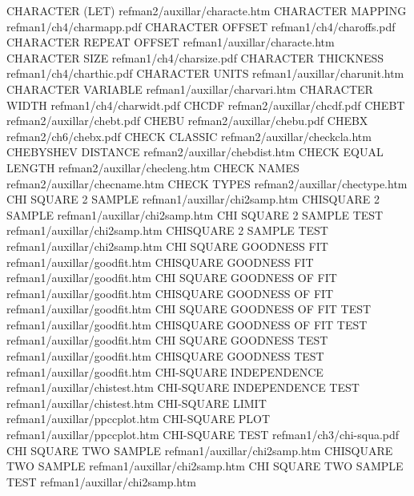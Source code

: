 CHARACTER (LET)                         refman2/auxillar/characte.htm
CHARACTER MAPPING                       refman1/ch4/charmapp.pdf
CHARACTER OFFSET                        refman1/ch4/charoffs.pdf
CHARACTER REPEAT OFFSET                 refman1/auxillar/characte.htm
CHARACTER SIZE                          refman1/ch4/charsize.pdf
CHARACTER THICKNESS                     refman1/ch4/charthic.pdf
CHARACTER UNITS                         refman1/auxillar/charunit.htm
CHARACTER VARIABLE                      refman1/auxillar/charvari.htm
CHARACTER WIDTH                         refman1/ch4/charwidt.pdf
CHCDF                                   refman2/auxillar/chcdf.pdf
CHEBT                                   refman2/auxillar/chebt.pdf
CHEBU                                   refman2/auxillar/chebu.pdf
CHEBX                                   refman2/ch6/chebx.pdf
CHECK CLASSIC                           refman2/auxillar/checkcla.htm
CHEBYSHEV DISTANCE                      refman2/auxillar/chebdist.htm
CHECK EQUAL LENGTH                      refman2/auxillar/checleng.htm
CHECK NAMES                             refman2/auxillar/checname.htm
CHECK TYPES                             refman2/auxillar/chectype.htm
CHI SQUARE 2 SAMPLE                     refman1/auxillar/chi2samp.htm
CHISQUARE 2 SAMPLE                      refman1/auxillar/chi2samp.htm
CHI SQUARE 2 SAMPLE TEST                refman1/auxillar/chi2samp.htm
CHISQUARE 2 SAMPLE TEST                 refman1/auxillar/chi2samp.htm
CHI SQUARE GOODNESS FIT                 refman1/auxillar/goodfit.htm
CHISQUARE GOODNESS FIT                  refman1/auxillar/goodfit.htm
CHI SQUARE GOODNESS OF FIT              refman1/auxillar/goodfit.htm
CHISQUARE GOODNESS OF FIT               refman1/auxillar/goodfit.htm
CHI SQUARE GOODNESS OF FIT TEST         refman1/auxillar/goodfit.htm
CHISQUARE GOODNESS OF FIT TEST          refman1/auxillar/goodfit.htm
CHI SQUARE GOODNESS TEST                refman1/auxillar/goodfit.htm
CHISQUARE GOODNESS TEST                 refman1/auxillar/goodfit.htm
CHI-SQUARE INDEPENDENCE                 refman1/auxillar/chistest.htm
CHI-SQUARE INDEPENDENCE TEST            refman1/auxillar/chistest.htm
CHI-SQUARE LIMIT                        refman1/auxillar/ppccplot.htm
CHI-SQUARE PLOT                         refman1/auxillar/ppccplot.htm
CHI-SQUARE TEST                         refman1/ch3/chi-squa.pdf
CHI SQUARE TWO SAMPLE                   refman1/auxillar/chi2samp.htm
CHISQUARE TWO SAMPLE                    refman1/auxillar/chi2samp.htm
CHI SQUARE TWO SAMPLE TEST              refman1/auxillar/chi2samp.htm

